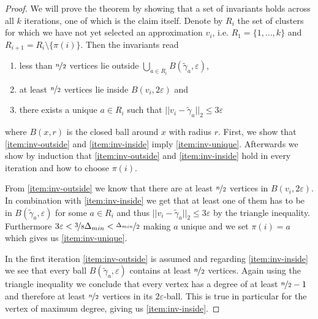 \documentclass[10pt,a4paper]{article}
\begin{document}
\begin{proof}
  We will prove the theorem by showing that a set of invariants holds across all $k$ iterations, one of which is the claim itself.
  Denote by $R_{i}$ the set of clusters for which we have not yet selected an approximation $v_{i}$, i.e. $R_{1} = \{ 1, \dots, k \}$ and $R_{i + 1} = R_{i} \setminus \{ \pi(i) \}$.
  Then the invariants read
  \begin{enumerate}[label=(\roman*)]
  \item \label{item:inv-outside} less than $\nicefrac{n}{2}$ vertices lie outside $\bigcup_{a \in R_{i}} B(\tilde{\gamma}_{a}, \varepsilon)$,
  \item \label{item:inv-inside} at least $\nicefrac{n}{2}$ vertices lie inside $B(v_{i}, 2\varepsilon)$ and
  \item \label{item:inv-unique} there exists a unique $a \in R_{i}$ such that $||v_{i} - \tilde{\gamma}_{a}||_{2} \le 3\varepsilon$
  \end{enumerate}
  where $B(x, r)$ is the closed ball around $x$ with radius $r$.
  First, we show that \ref{item:inv-outside} and \ref{item:inv-inside} imply \ref{item:inv-unique}.
  Afterwards we show by induction that \ref{item:inv-outside} and \ref{item:inv-inside} hold in every iteration and how to choose $\pi(i)$.

  From \ref{item:inv-outside} we know that there are at least $\nicefrac{n}{2}$ vertices in $B(v_{i}, 2\varepsilon)$.
  In combination with \ref{item:inv-inside} we get that at least one of them has to be in $B(\tilde{\gamma}_{a}, \varepsilon)$ for some $a \in R_{i}$ and thus $||v_{i} - \tilde{\gamma}_{a}||_{2} \le 3\varepsilon$ by the triangle inequality.
  Furthermore $3\varepsilon < \nicefrac{3}{8}\Delta_{min} < \nicefrac{\Delta_{min}}{2}$ making $a$ unique and we set $\pi(i) = a$ which gives us \ref{item:inv-unique}.

  In the first iteration \ref{item:inv-outside} is assumed and regarding \ref{item:inv-inside} we see that every ball $B(\tilde{\gamma}_{a}, \varepsilon)$ contains at least $\nicefrac{n}{2}$ vertices.
  Again using the triangle inequality we conclude that every vertex has a degree of at least $\nicefrac{n}{2} - 1$ and therefore at least $\nicefrac{n}{2}$ vertices in its $2\varepsilon$-ball.
  This is true in particular for the vertex of maximum degree, giving us \ref{item:inv-inside}.


\end{proof}
\end{document}
